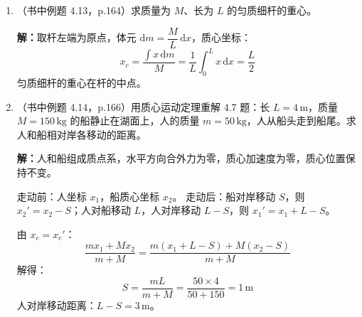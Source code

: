 \documentclass{ctexart}
\begin{document}
\begin{enumerate}
\item（书中例题 4.13，p.164）求质量为 $M$、长为 $L$ 的匀质细杆的重心。

\textbf{解：}取杆左端为原点，体元 $\mathrm{d}m = \dfrac{M}{L}\,\mathrm{d}x$，质心坐标：
\[
x_c = \frac{\int x\,\mathrm{d}m}{M} = \frac{1}{L}\int_0^L x\,\mathrm{d}x = \frac{L}{2}
\]
匀质细杆的重心在杆的中点。

\item（书中例题 4.14，p.166）用质心运动定理重解 4.7 题：长 $L = 4\,\text{m}$，质量 $M = 150\,\text{kg}$ 的船静止在湖面上，人的质量 $m = 50\,\text{kg}$，人从船头走到船尾。求人和船相对岸各移动的距离。

\textbf{解：}人和船组成质点系，水平方向合外力为零，质心加速度为零，质心位置保持不变。

走动前：人坐标 $x_1$，船质心坐标 $x_2$。
走动后：船对岸移动 $S$，则 $x_2' = x_2 - S$；人对船移动 $L$，人对岸移动 $L - S$，则 $x_1' = x_1 + L - S$。

由 $x_c = x_c'$：
\[
\frac{m x_1 + M x_2}{m + M} = \frac{m(x_1 + L - S) + M(x_2 - S)}{m + M}
\]
解得：
\[
S = \frac{mL}{m + M} = \frac{50\times4}{50 + 150} = 1\,\text{m}
\]
人对岸移动距离：$L - S = 3\,\text{m}$。

\end{enumerate}
\end{document}
